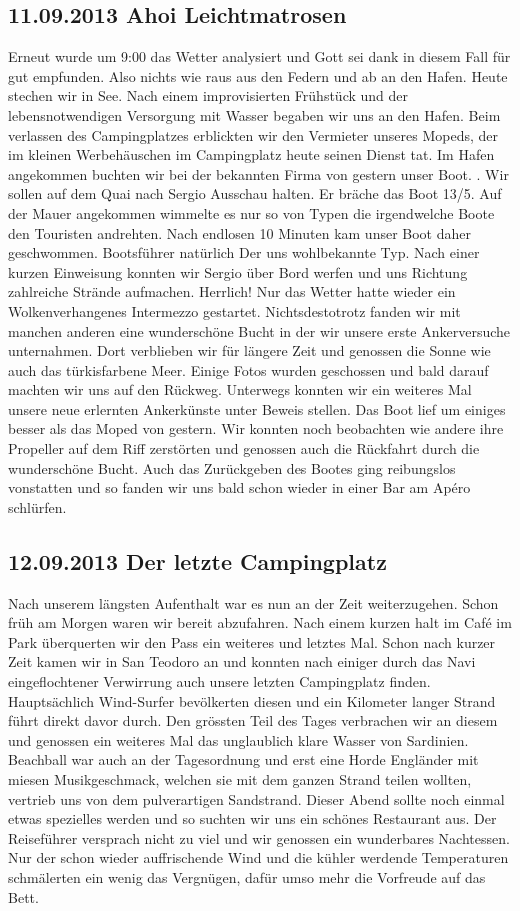 \subsection{11.09.2013 Ahoi Leichtmatrosen} 
Erneut wurde um 9:00 das Wetter analysiert und Gott sei dank in diesem Fall für gut empfunden.
Also nichts wie raus aus den Federn und ab an den Hafen.
Heute stechen wir in See.
Nach einem improvisierten Frühstück und der lebensnotwendigen Versorgung mit Wasser begaben wir uns an den Hafen.
Beim verlassen des Campingplatzes erblickten wir den Vermieter unseres Mopeds, der im kleinen Werbehäuschen im Campingplatz heute seinen Dienst tat.
Im Hafen angekommen buchten wir bei der bekannten Firma von gestern unser Boot.
.  Wir sollen auf dem Quai nach Sergio Ausschau halten.
Er bräche das Boot 13/5.
Auf der Mauer angekommen wimmelte es nur so von Typen die irgendwelche Boote den Touristen andrehten.
Nach endlosen 10 Minuten kam unser Boot daher geschwommen.
Bootsführer natürlich Der uns wohlbekannte Typ.
Nach einer kurzen Einweisung konnten wir Sergio über Bord werfen und uns Richtung zahlreiche Strände aufmachen.
Herrlich! Nur das Wetter hatte wieder ein Wolkenverhangenes Intermezzo gestartet.
Nichtsdestotrotz fanden wir mit manchen anderen eine wunderschöne Bucht in der wir unsere erste Ankerversuche unternahmen.
Dort verblieben wir für längere Zeit und genossen die Sonne wie auch das türkisfarbene Meer.
Einige Fotos wurden geschossen und bald darauf machten wir uns auf den Rückweg.
Unterwegs konnten wir ein weiteres Mal unsere neue erlernten Ankerkünste unter Beweis stellen.
Das Boot lief um einiges besser als das Moped von gestern.
Wir konnten noch beobachten wie andere ihre Propeller auf dem Riff zerstörten und genossen auch die Rückfahrt durch die wunderschöne Bucht.
Auch das Zurückgeben des Bootes ging reibungslos vonstatten und so fanden wir uns bald schon wieder in einer Bar am Apéro schlürfen.  

\subsection{12.09.2013 Der letzte Campingplatz}
Nach unserem längsten Aufenthalt war es nun an der Zeit weiterzugehen.
Schon früh am Morgen waren wir bereit abzufahren.
Nach einem kurzen halt im Café im Park überquerten wir den Pass ein weiteres und letztes Mal.
Schon nach kurzer Zeit kamen wir in San Teodoro an und konnten nach einiger durch das Navi eingeflochtener Verwirrung auch unsere letzten Campingplatz finden.
Hauptsächlich Wind-Surfer bevölkerten diesen und ein Kilometer langer Strand führt direkt davor durch.
Den grössten Teil des Tages verbrachen wir an diesem und genossen ein weiteres Mal das unglaublich klare Wasser von Sardinien.
Beachball war auch an der Tagesordnung und erst eine Horde Engländer mit miesen Musikgeschmack, welchen sie mit dem ganzen Strand teilen wollten, vertrieb uns von dem pulverartigen Sandstrand.
Dieser Abend sollte noch einmal etwas spezielles werden und so suchten wir uns ein schönes Restaurant aus.
Der Reiseführer versprach nicht zu viel und wir genossen ein wunderbares Nachtessen.
Nur der schon wieder auffrischende Wind und die kühler werdende Temperaturen schmälerten ein wenig das Vergnügen, dafür umso mehr die Vorfreude auf das Bett. 

